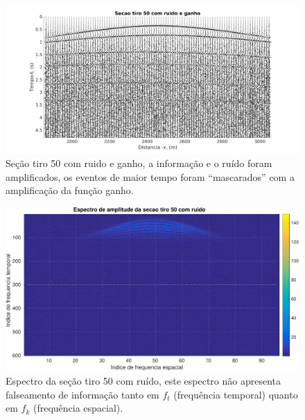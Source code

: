 \begin{landscape}
\begin{figure}[H]
\centering
\includegraphics[totalheight=14cm]{figuras/cap2/secao_tiro50_ruido_gain.pdf}
\caption{Seção tiro 50 com ruido e ganho, a informação e o ruído foram amplificados, os eventos de maior tempo foram ``mascarados'' com a amplificação da função ganho.}
\label{fig:tiro_50ruido_gain}
\end{figure}
\end{landscape}

\begin{landscape}
\begin{figure}[H]
\centering
\includegraphics[totalheight=14cm]{figuras/cap2/espc_tiro50.pdf}
\caption{Espectro da seção tiro 50 com ruído, este espectro não apresenta falseamento de informação tanto em $f_t$ (frequência temporal) quanto em $f_k$ (frequência espacial).}
\label{fig:espc_tiro50}
\end{figure}
\end{landscape}

